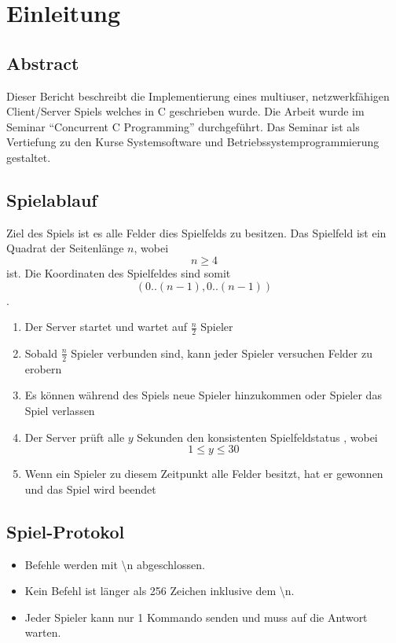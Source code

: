 


\chapter{Einleitung}

\section{Abstract}
\label{abstract}
Dieser Bericht beschreibt die Implementierung eines multiuser, netzwerkfähigen Client/Server Spiels welches in C geschrieben wurde. Die Arbeit wurde im Seminar ``Concurrent C Programming'' durchgeführt. Das Seminar ist als Vertiefung zu den Kurse Systemsoftware und Betriebssystemprogrammierung gestaltet.

\section{Spielablauf}
Ziel des Spiels ist es alle Felder dies Spielfelds zu besitzen. Das Spielfeld ist ein Quadrat der Seitenlänge $n$, wobei $$n \geq  4$$ ist. Die Koordinaten des Spielfeldes sind somit $$(0..(n-1), 0..(n-1))$$.

\begin{enumerate}
	\item Der Server startet und wartet auf $\frac{n}{2}$ Spieler
	\item Sobald $\frac{n}{2}$ Spieler verbunden sind, kann jeder Spieler versuchen Felder zu erobern
	\item Es können während des Spiels neue Spieler hinzukommen oder Spieler das Spiel verlassen
	\item Der Server prüft alle $y$ Sekunden den konsistenten Spielfeldstatus , wobei $$1 \leq y \leq 30$$
	\item Wenn ein Spieler zu diesem Zeitpunkt alle Felder besitzt, hat er gewonnen und das Spiel wird beendet
\end{enumerate}

\section{Spiel-Protokol}
\begin{itemize}
	\item Befehle werden mit \textbackslash n abgeschlossen.
	\item Kein Befehl ist länger als 256 Zeichen inklusive dem \textbackslash n.
	\item Jeder Spieler kann nur 1 Kommando senden und muss auf die Antwort warten.
\end{itemize}

